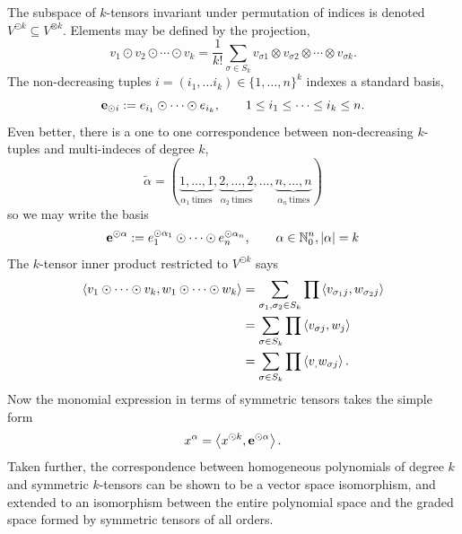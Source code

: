 The subspace of $k$-tensors invariant under permutation of indices is denoted $V^{\odot k} \subseteq V^{\otimes k}$. Elements may be defined by the projection,
\[
  v_1 \odot v_2 \odot \cdots \odot v_k = \frac1{k!} \sum_{\sigma \in S_k} v_{\sigma 1} \otimes v_{\sigma 2} \otimes \cdots \otimes v_{\sigma k}.
\]
The non-decreasing tuples $i = (i_1, \ldots i_k) \in \{1, \ldots, n\}^k$ indexes a standard basis, 
\[
  \bf{e}_{\odot i} 
  := e_{i_1} \odot \cdots \odot e_{i_k}, 
  \qquad 1 \leq i_1 \leq \cdots \leq i_k \leq n.
\]
Even better, there is a one to one correspondence between non-decreasing $k$-tuples and multi-indeces of degree $k$,
\[
  \tilde{\alpha} = (\underbrace{1, \ldots, 1}_{\alpha_1 ~\text{times}}, \underbrace{2, \ldots, 2}_{\alpha_2 ~\text{times}}, \ldots , \underbrace{n, \ldots, n}_{\alpha_n ~\text{times}})
\] 
so we may write the basis
\[
  \bf{e}^{\odot \alpha} 
  := e_{1}^{\odot \alpha_1} \odot \cdots \odot e_{n}^{\odot \alpha_n},
  \qquad \alpha \in \NN_0^n, |\alpha| = k
\]
The $k$-tensor inner product restricted to $V^{\odot k}$ says
\begin{align*}
  \inner{v_1 \odot \cdots \odot v_k, w_1 \odot \cdots \odot w_k} 
  &= \sum_{\sigma_1, \sigma_2 \in S_k} \prod \inner{v_{\sigma_1j}, w_{\sigma_2j}} \\
  &= \sum_{\sigma \in S_k} \prod \inner{v_{\sigma j}, w_j} \\
  &= \sum_{\sigma \in S_k} \prod \inner{v_, w_{\sigma j}}.
\end{align*}
Now the monomial expression in terms of symmetric tensors takes the simple form
\[
  x^\alpha = \inner{x^{\odot k}, \bf{e}^{\odot \alpha}}.
\]
Taken further, the correspondence between homogeneous polynomials of degree $k$ and symmetric $k$-tensors can be shown to be a vector space isomorphism, and extended to an isomorphism between the entire polynomial space and the graded space formed by symmetric tensors of all orders.



